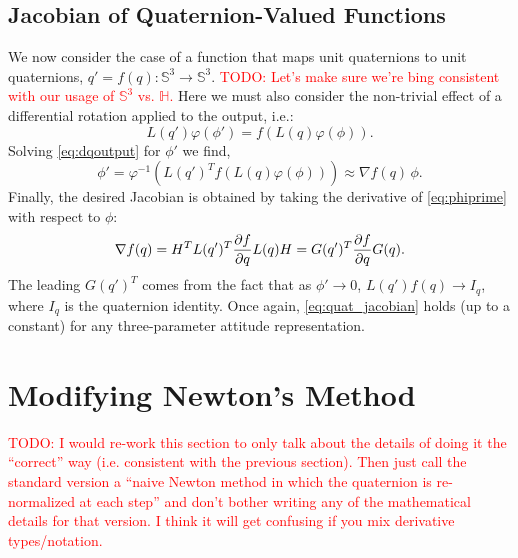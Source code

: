 \documentclass[letterpaper, 10 pt, conference]{ieeeconf}  %
\newcommand{\Q}{\mathbb{S}^3}
\newcommand{\todo}[1]{\textcolor{red}{TODO: #1}}
\begin{document}
    \subsection{Jacobian of Quaternion-Valued Functions}
        We now consider the case of a function that maps unit quaternions to unit
        quaternions, $q' = f(q) : \Q \to \Q$. \todo{Let's make sure we're bing consistent with our usage of $\Q$ vs. $\mathbb{H}$.} Here we must also consider the non-trivial
        effect of a differential rotation applied to the output, i.e.:
        \begin{equation} \label{eq:dqoutput}
            L(q') \varphi(\phi') = f(L(q)\varphi(\phi)) .
        \end{equation}
        Solving \eqref{eq:dqoutput} for $\phi'$ we find,
        \begin{equation} \label{eq:phiprime}
            \phi' = \varphi^{-1} \left( L(q')^T f(L(q)\varphi(\phi)) \right) \approx \nabla f(q) \, \phi.
        \end{equation}
        Finally, the desired Jacobian is obtained by taking the derivative of
        \eqref{eq:phiprime} with respect to $\phi$:
        \begin{equation} \label{eq:quat_jacobian}
            \nabla f(q) = H^T L(q')^T \pdv{f}{q} L(q) H = G(q')^T \pdv{f}{q} G(q).
        \end{equation}
        The leading $G(q')^T$ comes from the fact that as $\phi' \to 0$, $L(q') f(q) \to
        I_q$, where $I_q$ is the quaternion identity. Once again, \eqref{eq:quat_jacobian} holds (up to a constant) for any three-parameter attitude representation.
        


\section{Modifying Newton's Method} \label{sec:Wahbas}

\todo{I would re-work this section to only talk about the details of doing it the ``correct'' way (i.e. consistent with the previous section). Then just call the standard version a ``naive Newton method in which the quaternion is re-normalized at each step'' and don't bother writing any of the mathematical details for that version. I think it will get confusing if you mix derivative types/notation.}
\end{document}
